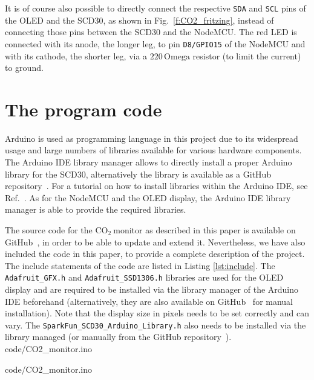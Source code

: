 \documentclass[12pt,a4paper]{article}
\newcommand{\coo}{\ensuremath{\mathrm{CO_2}~}}
\begin{document}
It is of course also possible to directly connect the respective \texttt{SDA} and \texttt{SCL} pins of the OLED and the SCD30, as shown in Fig.~\ref{f:CO2_fritzing}, instead of connecting those pins between the SCD30 and the NodeMCU. The red LED is connected with its anode, the longer leg, to pin \texttt{D8/GPIO15} of the NodeMCU and with its cathode, the shorter leg, via a $220\,\mathrm{Omega}$ resistor (to limit the current) to ground.  




\section{The program code}\label{s:code}
Arduino is used as programming language in this project due to its widespread usage and large numbers of libraries available for various hardware components. The Arduino IDE library manager allows to directly install a proper Arduino library for the SCD30, alternatively the library is available as a GitHub repository~\cite{SPARKFUN2020}. For a tutorial on how to install libraries within the Arduino IDE, see Ref.~\cite{SPARKFUN2020A}.
As for the NodeMCU and the OLED display, the Arduino IDE library manager is able to provide the required libraries.

The source code for the \coo monitor as described in this paper is available on GitHub~\cite{KOEHN2020}, in order to be able to update and extend it. Nevertheless, we have also included the code in this paper, to provide a complete description of the project. The include statements of the code are listed in Listing \ref{lst:include}. The \texttt{Adafruit\_GFX.h} and \texttt{Adafruit\_SSD1306.h} libraries are used for the OLED display and are required to be installed via the library manager of the Arduino IDE beforehand (alternatively, they are also available on GitHub~\cite{ADAFRUIT2020A} for manual installation). Note that the display size in pixels needs to be set correctly and can vary. The \texttt{SparkFun\_SCD30\_Arduino\_Library.h} also needs to be installed via the library managed (or manually from the GitHub repository~\cite{SPARKFUN2020}).
%
{code/CO2_monitor.ino} 

%
{code/CO2_monitor.ino}
\end{document}
